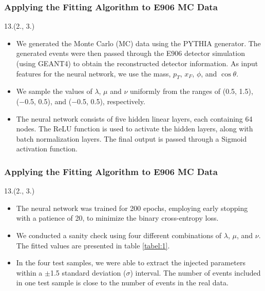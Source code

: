\documentclass[12pt, xcolor={dvipsnames}, aspectratio = 169, sans,mathserif]{beamer}
\newenvironment{List}[2]
{\begin{textblock}{#1}#2
\begin{itemize}}
{\end{itemize}
\end{textblock}}
\newcommand{\NPcite}[1]{{\tiny \footfullcite{#1}}}
\begin{document}
\begin{frame}
\frametitle{Applying the Fitting Algorithm to E906 MC Data}

\begin{List}{13.}{(2., 3.)}

  \item We generated the Monte Carlo (MC) data using the PYTHIA generator. The generated events were then passed through
  the E906 detector simulation (using GEANT4) to obtain the reconstructed detector information. As input features for the neural network,
  we use the mass, $p_{T}$, $x_{F}$, $\phi$, and $\cos\theta$.

  \item We sample the values of $\lambda$, $\mu$ and $\nu$ uniformly  from the ranges of (0.5, 1.5), (−0.5, 0.5), and
  (−0.5, 0.5), respectively.\NPcite{NuSea:2006gvb}

  \item The neural network consists of five hidden linear layers, each containing 64 nodes. The ReLU function is used
  to activate the hidden layers, along with batch normalization layers. The final output is passed through a Sigmoid activation function.

\end{List}

\end{frame}

\begin{frame}
\frametitle{Applying the Fitting Algorithm to E906 MC Data}

\begin{List}{13.}{(2., 3.)}

  \item The neural network was trained for 200 epochs, employing early stopping with a patience of 20, to minimize the
  binary cross-entropy loss.

  \item We conducted a sanity check using four different combinations of $\lambda$, $\mu$, and $\nu$. The fitted values
  are presented in table \ref{tabel:1}.

  \item In the four test samples, we were able to extract the injected parameters within a $\pm$1.5 standard deviation
  ($\sigma$) interval. The number of events included in one test sample is close to the number of events in the real data.

\end{List}

\end{frame}
\end{document}
